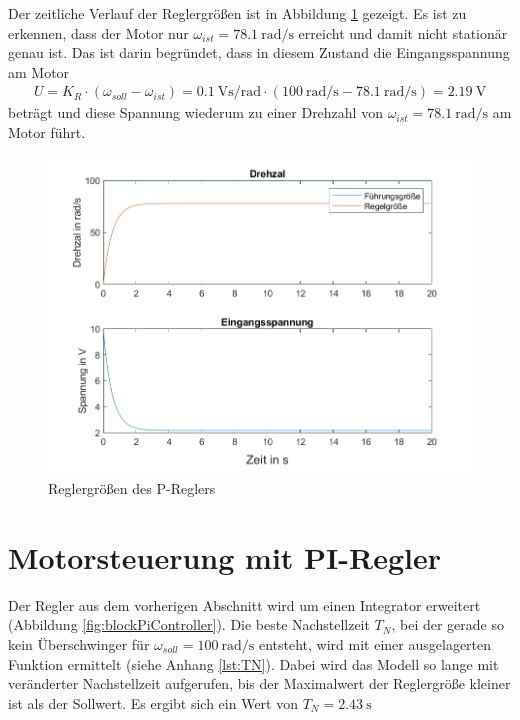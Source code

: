 \documentclass[
    paper=a4,
    fontsize=10pt,
    DIV=12,
    oneside,
]{scrartcl}
\begin{document}
    Der zeitliche Verlauf der Reglergrößen ist in Abbildung \ref{fig:graphPController} gezeigt. Es ist zu erkennen, dass der Motor nur \(\omega_{ist} = \SI{78,1}{\radian\per\second}\) erreicht und damit nicht stationär genau ist. Das ist darin begründet, dass in diesem Zustand die Eingangsspannung am Motor 
    \begin{align}
        U = K_R \cdot (\omega_{soll} - \omega_{ist}) = \SI{0.1}{\volt\second\per\radian} \cdot \left( \SI{100}{\radian\per\second} - \SI{78.1}{\radian\per\second} \right) = \SI{2.19}{\volt}
    \end{align}
    beträgt und diese Spannung wiederum zu einer Drehzahl von \(\omega_{ist} = \SI{78,1}{\radian\per\second}\) am Motor führt.

    \begin{figure}[hbt]
        \centering
        \includegraphics[width=\imagewidth]{../versuch3/graphPController}
        \caption{Reglergrößen des P-Reglers}
        \label{fig:graphPController}
    \end{figure}   

\section{Motorsteuerung mit PI-Regler}
    Der Regler aus dem vorherigen Abschnitt wird um einen Integrator erweitert (Abbildung \ref{fig:blockPiController}). Die beste Nachstellzeit \(T_N\), bei der gerade so kein Überschwinger für \(\omega_{soll} = \SI{100}{\radian\per\second}\) entsteht, wird mit einer ausgelagerten Funktion ermittelt (siehe Anhang \ref{lst:TN}). Dabei wird das Modell so lange mit veränderter Nachstellzeit aufgerufen, bis der Maximalwert der Reglergröße kleiner ist als der Sollwert. Es ergibt sich ein Wert von \(T_N = \SI{2.43}{\second}\)
\end{document}
